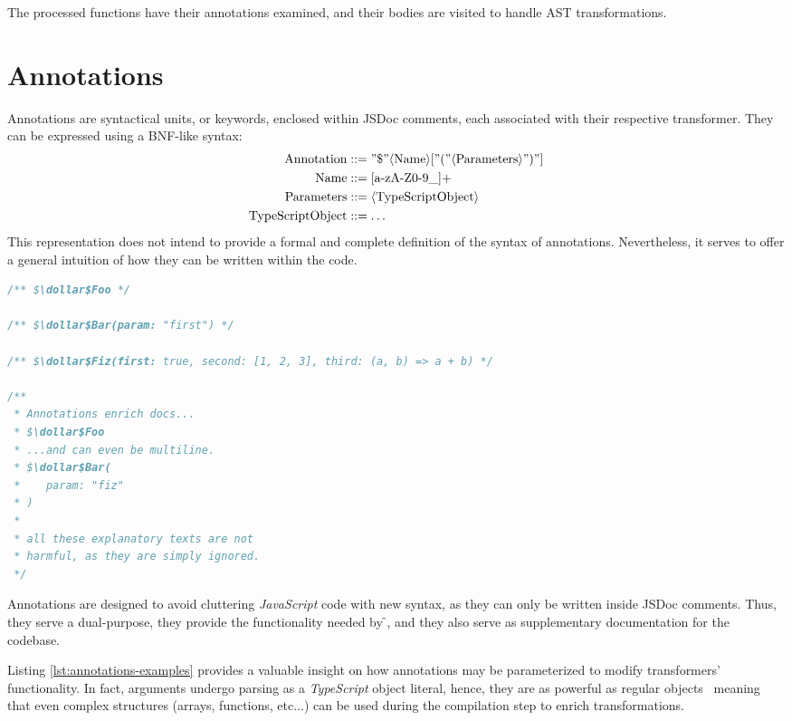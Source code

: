 The processed functions have their annotations examined, and
their bodies are visited to handle AST transformations.

\section{Annotations}
\label{sec:annotations}

Annotations are syntactical units, or keywords, enclosed within JSDoc comments,
each associated with their respective transformer.
They can be expressed using a BNF-like syntax:
\begin{equation*}
\begin{aligned}
    \text{Annotation} & ::= "\$" \langle \text{Name} \rangle [ "(" \langle \text{Parameters} \rangle ")" ] \\
    \text{Name} & ::= [\text{a-zA-Z0-9\_}]+ \\
    \text{Parameters} & ::= \langle \text{TypeScriptObject} \rangle \\
    \text{TypeScriptObject} & ::= \dots \\
\end{aligned}
\end{equation*}
This representation does not intend to provide a formal and complete definition of the syntax of annotations.
Nevertheless, it serves to offer a general intuition of how they can be written within the code.
\begin{lstlisting}[language=javascript, caption={Generic examples of annotation.}, label={lst:annotations-examples}]
/** $\dollar$Foo */

/** $\dollar$Bar(param: "first") */

/** $\dollar$Fiz(first: true, second: [1, 2, 3], third: (a, b) => a + b) */

/**
 * Annotations enrich docs...
 * $\dollar$Foo
 * ...and can even be multiline.
 * $\dollar$Bar(
 *    param: "fiz"
 * )
 *
 * all these explanatory texts are not 
 * harmful, as they are simply ignored.
 */
\end{lstlisting}

Annotations are designed to avoid cluttering \textit{JavaScript} code with new syntax,
as they can only be written inside JSDoc comments.
Thus, they serve a dual-purpose, they provide the functionality needed by \f{},
and they also serve as supplementary documentation for the codebase.

Listing \ref{lst:annotations-examples} provides a valuable insight on how annotations
may be parameterized to modify transformers' functionality.
In fact, arguments undergo parsing as a \textit{TypeScript} object literal,
hence, they are as powerful as regular objects~\cite{mdn_objects}
meaning that even complex structures (arrays, functions, etc...) can be used
during the compilation step to enrich transformations.

